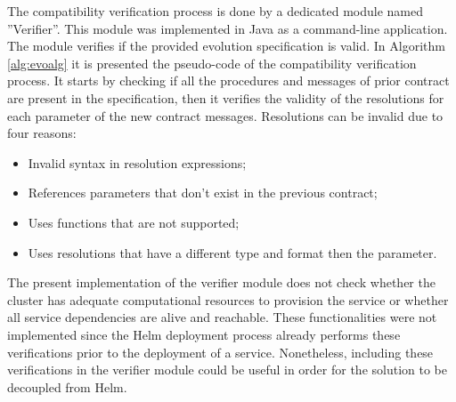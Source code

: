The compatibility verification process is done by a dedicated module named ''Verifier''.
This module was implemented in Java as a command-line application.
The module verifies if the provided evolution specification is valid.
In Algorithm \ref{alg:evoalg} it is presented the pseudo-code of the compatibility verification process.
It starts by checking if all the procedures and messages of prior contract are present in the specification,
then it verifies the validity of the resolutions for each parameter of the new contract messages.
Resolutions can be invalid due to four reasons:
\begin{itemize}
    \setlength\itemsep{0em}
    \item Invalid syntax in resolution expressions;
    \item References parameters that don't exist in the previous contract;
    \item Uses functions that are not supported;
    \item Uses resolutions that have a different type and format then the parameter.
\end{itemize}

The present implementation of the verifier module does not check whether the cluster has adequate computational resources to provision the service or whether all service dependencies are alive and reachable.
These functionalities were not implemented since the Helm deployment process already performs these verifications prior to the deployment of a service.
Nonetheless, including these verifications in the verifier module could be useful in order for the solution to be decoupled from Helm.

